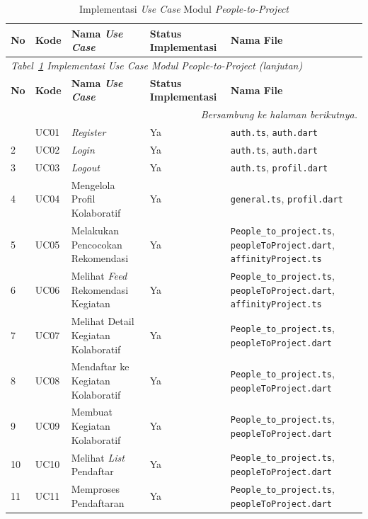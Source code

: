 \begin{longtable}{p{0.4cm} p{1cm} p{4cm} p{2.5cm} >{\raggedright\arraybackslash}p{\dimexpr\linewidth-7.9cm-10\tabcolsep\relax}}
  \caption{Implementasi \emph{Use Case} Modul \emph{People-to-Project}}
  \label{tab:uc-impl} \\
  \toprule
    \textbf{No} & \textbf{Kode} & \textbf{Nama \emph{Use Case}} & \textbf{Status Implementasi} & \textbf{Nama File} \\
  \midrule
  \endfirsthead
  \multicolumn{5}{l}{\small\textit{Tabel~\ref{tab:uc-impl} Implementasi \emph{Use Case} Modul \emph{People-to-Project} (lanjutan)}} \\
  \toprule
    \textbf{No} & \textbf{Kode} & \textbf{Nama \emph{Use Case}} & \textbf{Status Implementasi} & \textbf{Nama File} \\
  \midrule
  \endhead
  \bottomrule
  \multicolumn{5}{r}{\textit{Bersambung ke halaman berikutnya.}} \\
  \endfoot
  \bottomrule
  \endlastfoot
    1 & UC01 & \emph{Register} & Ya & \texttt{auth.ts}, \texttt{auth.dart} \\
    \midrule
    2 & UC02 & \emph{Login} & Ya & \texttt{auth.ts}, \texttt{auth.dart} \\
    \midrule
    3 & UC03 & \emph{Logout} & Ya & \texttt{auth.ts}, \texttt{profil.dart} \\
    \midrule
    4 & UC04 & Mengelola Profil Kolaboratif & Ya & \texttt{general.ts}, \texttt{profil.dart} \\
    \midrule
    5 & UC05 & Melakukan Pencocokan Rekomendasi & Ya & \texttt{People\_to\_project.ts}, \texttt{peopleToProject.dart}, \texttt{affinityProject.ts} \\
    \midrule
    6 & UC06 & Melihat \emph{Feed} Rekomendasi Kegiatan & Ya & \texttt{People\_to\_project.ts}, \texttt{peopleToProject.dart}, \texttt{affinityProject.ts} \\
    \midrule
    7 & UC07 & Melihat Detail Kegiatan Kolaboratif & Ya & \texttt{People\_to\_project.ts}, \texttt{peopleToProject.dart} \\
    \midrule
    8 & UC08 & Mendaftar ke Kegiatan Kolaboratif & Ya & \texttt{People\_to\_project.ts}, \texttt{peopleToProject.dart} \\
    \midrule
    9 & UC09 & Membuat Kegiatan Kolaboratif & Ya & \texttt{People\_to\_project.ts}, \texttt{peopleToProject.dart} \\
    \midrule
    10 & UC10 & Melihat \emph{List} Pendaftar & Ya & \texttt{People\_to\_project.ts}, \texttt{peopleToProject.dart} \\
    \midrule
    11 & UC11 & Memproses Pendaftaran & Ya & \texttt{People\_to\_project.ts}, \texttt{peopleToProject.dart} \\
\end{longtable}


